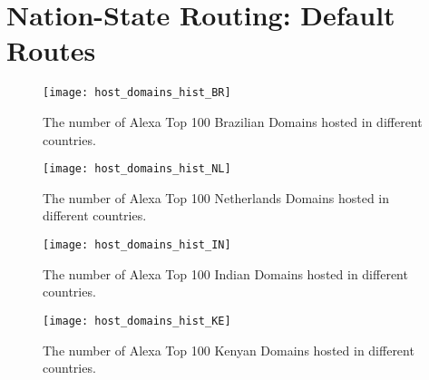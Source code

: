 \section{Nation-State Routing: Default Routes}

\begin{figure}
\centering
\texttt{[image: host\_domains\_hist\_BR]}
\caption{The number of Alexa Top 100 Brazilian Domains hosted in different countries.}
\label{fig:host_diversity_BR}
\end{figure}

\begin{figure}
\centering
\texttt{[image: host\_domains\_hist\_NL]}
\caption{The number of Alexa Top 100 Netherlands Domains hosted in different countries.}
\label{fig:host_diversity_NL}
\end{figure}

\begin{figure}
\centering
\texttt{[image: host\_domains\_hist\_IN]}
\caption{The number of Alexa Top 100 Indian Domains hosted in different countries.}
\label{fig:host_diversity_IN}
\end{figure}

\begin{figure}
\centering
\texttt{[image: host\_domains\_hist\_KE]}
\caption{The number of Alexa Top 100 Kenyan Domains hosted in different countries.}
\label{fig:host_diversity_KE}
\end{figure}

